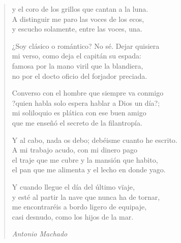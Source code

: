\begin{verse}
\begin{center}
y el coro de los grillos que cantan a la luna. \\


A distinguir me paro las voces de los ecos, \\


y escucho solamente, entre las voces, una.

\par

¿Soy clásico o romántico? No sé. Dejar quisiera \\


mi verso, como deja el capitán su espada: \\


famosa por la mano viril que la blandiera, \\


no por el docto oficio del forjador preciada.

\par

Converso con el hombre que siempre va conmigo \\


?quien habla solo espera hablar a Dios un día?; \\


mi soliloquio es plática con ese buen amigo \\


que me enseñó el secreto de la filantropía.

\par

Y al cabo, nada os debo; debéisme cuanto he escrito. \\


A mi trabajo acudo, con mi dinero pago \\


el traje que me cubre y la mansión que habito, \\


el pan que me alimenta y el lecho en donde yago.

\par

Y cuando llegue el día del último vïaje, \\


y esté al partir la nave que nunca ha de tornar, \\


me encontraréis a bordo ligero de equipaje, \\


casi desnudo, como los hijos de la mar.

\par{\it Antonio Machado}

\end{center}

\end{verse}      